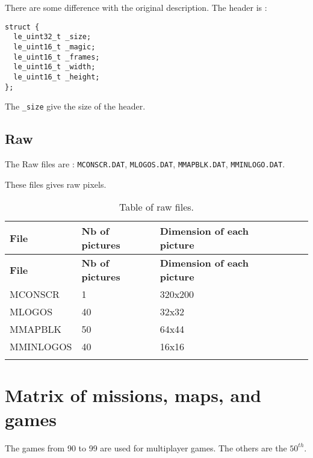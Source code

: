 \documentclass[a4paper,twoside,12pt,dvips]{article}
\begin{document}
There are some difference with the original description. The header is :
\begin{lstlisting}
struct {
  le_uint32_t _size;
  le_uint16_t _magic;
  le_uint16_t _frames;
  le_uint16_t _width;
  le_uint16_t _height;
};
\end{lstlisting}

The \texttt{\_size} give the size of the header.


\subsection{Raw}
\label{sec:raw}

The Raw files are : \texttt{MCONSCR.DAT}, \texttt{MLOGOS.DAT}, \texttt{MMAPBLK.DAT}, \texttt{MMINLOGO.DAT}. 

These files gives raw pixels.

\begin{center}
  \begin{longtable}{|l|l|l|l|l|}

    \hline \textbf{File} & \textbf{Nb of pictures} & \textbf{Dimension of each picture} \\ \hline 
    \endfirsthead

    \hline \textbf{File} & \textbf{Nb of pictures} & \textbf{Dimension of each picture} \\ \hline 
    \endhead

    MCONSCR & 1 & 320x200 \\
    \hline

    MLOGOS  & 40 & 32x32 \\
    \hline

    MMAPBLK  & 50 & 64x44 \\
    \hline

    MMINLOGOS  & 40 & 16x16 \\
    \hline

    \caption[Table of raw files]{Table of raw files.} \label{tab:raw_files} \\

  \end{longtable}
\end{center}


\section{Matrix of missions, maps, and games}
\label{sec:matrixmismapgame}

The games from 90 to 99 are used for multiplayer games. The others are the $50^{th}$.
\end{document}
